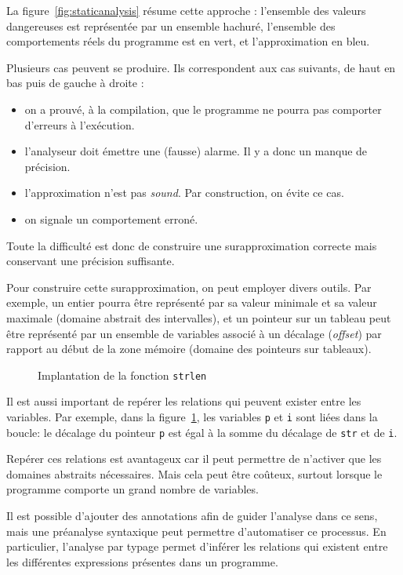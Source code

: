 La figure~\ref{fig:staticanalysis} résume cette approche : l'ensemble des
valeurs dangereuses est représentée par un ensemble hachuré, l'ensemble des
comportements réels du programme est en vert, et l'approximation en bleu.

Plusieurs cas peuvent se produire. Ils correspondent aux cas suivants, de haut
en bas puis de gauche à droite :

\begin{itemize}
  \item on a prouvé, à la compilation, que le programme ne pourra pas comporter
  d'erreurs à l'exécution.
  \item l'analyseur doit émettre une (fausse) alarme. Il y a donc un manque de
  précision.
  \item l'approximation n'est pas \emph{sound}. Par construction, on évite ce
  cas.
  \item on signale un comportement erron\'e.
\end{itemize}

Toute la difficulté est donc de construire une surapproximation correcte mais
conservant une précision suffisante.

Pour construire cette surapproximation, on peut employer divers outils. Par
exemple, un entier pourra être représenté par sa valeur minimale et sa valeur
maximale (domaine abstrait des intervalles), et un pointeur sur un tableau peut
être représenté par un ensemble de variables associé à un décalage
(\emph{offset}) par rapport au début de la zone mémoire (domaine des pointeurs
sur tableaux).

\begin{figure}
\caption{Implantation de la fonction \texttt{strlen}}
\label{fig:strlen}
\end{figure}

Il est aussi important de repérer les relations qui peuvent exister entre les
variables. Par exemple, dans la figure~\ref{fig:strlen}, les variables
\texttt{p} et \texttt{i} sont liées dans la boucle: le décalage du pointeur
\texttt{p} est égal à la somme du décalage de \texttt{str} et de \texttt{i}.

Repérer ces relations est avantageux car il peut permettre de n'activer que les
domaines abstraits nécessaires. Mais cela peut être coûteux, surtout lorsque le
programme comporte un grand nombre de variables.

Il est possible d'ajouter des annotations afin de guider l'analyse dans ce sens,
mais une préanalyse syntaxique peut permettre d'automatiser ce processus. En
particulier, l'analyse par typage permet d'inférer les relations qui existent
entre les différentes expressions présentes dans un programme.

